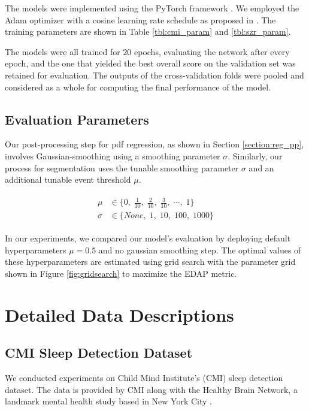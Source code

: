 \documentclass{article}
\begin{document}
The models were implemented using the PyTorch framework \citep{ansel2024}. We employed the Adam optimizer with a cosine learning rate schedule as proposed in \citep{kingma15,loshchilov2017}. The training parameters are shown in Table \ref{tbl:cmi_param} and \ref{tbl:szr_param}. 

The models were all trained for $20$ epochs, evaluating the network after every epoch, and the one that yielded the best overall score on the validation set was retained for evaluation.  The outputs of the cross-validation folds were pooled and considered as a whole for computing the final performance of the model.

\subsection{Evaluation Parameters}

Our post-processing step for pdf regression, as shown in Section \ref{section:reg_pp}, involves Gaussian-smoothing using a smoothing parameter $\sigma$. Similarly, our process for segmentation uses the tunable smoothing parameter $\sigma$ and an additional tunable event threshold $\mu$. 

\begin{align}
\label{fig:gridsearch}
\begin{split}
\mu &\in \{0,\; \frac{1}{10},\; \frac{2}{10},\; \frac{3}{10},\; \cdots,\; 1\} \\ 
\sigma &\in \{None,\;  1,\;  10,\;  100,\;  1000\}
\end{split}
\end{align}

In our experiments, we compared our model’s evaluation by deploying default hyperparameters $\mu = 0.5$ and no gaussian smoothing step. The optimal values of these hyperparameters are estimated using grid search with the parameter grid shown in Figure \ref{fig:gridsearch} to maximize the EDAP metric.

\section{Detailed Data Descriptions}
\label{appendix:data_description}
\subsection{CMI Sleep Detection Dataset}
We conducted experiments on Child Mind Institute's (CMI) sleep detection dataset. The data is provided by CMI along with the Healthy Brain Network, a landmark mental health study based in New York City \citep{alexander2017}. 
\end{document}
